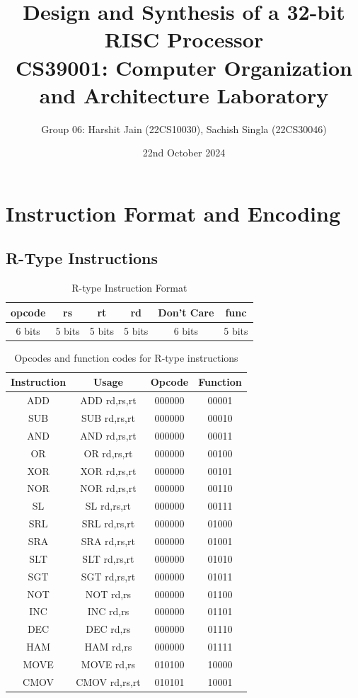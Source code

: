 \documentclass{article}
\title{\textbf{Design and Synthesis of a 32-bit RISC Processor}\\[0.5em]
\large CS39001: Computer Organization and Architecture Laboratory}
\author{Group 06: Harshit Jain (22CS10030), Sachish Singla (22CS30046)}
\date{22nd October 2024}
\begin{document}
\maketitle

\tableofcontents
\newpage

\section{ Instruction Format and Encoding}

\subsection{R-Type Instructions}
\begin{table}[H]
    \centering
    \begin{tabular}{|c|c|c|c|c|c|}
        \hline
        \textbf{opcode} & \textbf{rs} & \textbf{rt} & \textbf{rd} & \textbf{Don't Care} & \textbf{func} \\
        \hline
        6 bits & 5 bits & 5 bits & 5 bits & 6 bits & 5 bits \\
        \hline
    \end{tabular}
    \caption{R-type Instruction Format}
\end{table}

\begin{table}[H]
    \centering
    \begin{tabular}{|c|c|c|c|}
        \hline
        \textbf{Instruction} & \textbf{Usage} & \textbf{Opcode} & \textbf{Function} \\
        \hline
        ADD & ADD rd,rs,rt & 000000 & 00001 \\
        SUB & SUB rd,rs,rt & 000000 & 00010 \\
        AND & AND rd,rs,rt & 000000 & 00011 \\
        OR  & OR rd,rs,rt & 000000 & 00100 \\
        XOR & XOR rd,rs,rt & 000000 & 00101 \\
        NOR & NOR rd,rs,rt & 000000 & 00110 \\
        SL  & SL rd,rs,rt  & 000000 & 00111 \\
        SRL & SRL rd,rs,rt & 000000 & 01000 \\
        SRA & SRA rd,rs,rt & 000000 & 01001 \\
        SLT & SLT rd,rs,rt & 000000 & 01010 \\
        SGT & SGT rd,rs,rt & 000000 & 01011 \\
        NOT & NOT rd,rs & 000000 & 01100 \\
        INC & INC rd,rs & 000000 & 01101 \\
        DEC & DEC rd,rs & 000000 & 01110 \\
        HAM & HAM rd,rs & 000000 & 01111 \\
        MOVE & MOVE rd,rs & 010100 & 10000 \\
        CMOV & CMOV rd,rs,rt & 010101 & 10001 \\
        \hline
    \end{tabular}
    \caption{Opcodes and function codes for R-type instructions}
\end{table}
\end{document}
